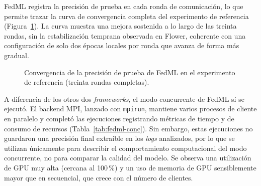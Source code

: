 FedML registra la precisión de prueba en cada ronda de comunicación, lo que permite trazar la
curva de convergencia completa del experimento de referencia (Figura~\ref{fig:fedml-conv}). La
curva muestra una mejora sostenida a lo largo de las treinta rondas, sin la estabilización
temprana observada en Flower, coherente con una configuración de solo dos épocas locales por
ronda que avanza de forma más gradual.

\begin{figure}[htbp]
  \centering
  \caption{Convergencia de la precisión de prueba de FedML en el experimento de referencia
  (treinta rondas completas).}
  \label{fig:fedml-conv}
\end{figure}

A diferencia de los otros dos \textit{frameworks}, el modo concurrente de FedML sí se ejecutó.
El backend MPI, lanzado con \texttt{mpirun}, mantiene varios procesos de cliente en paralelo y
completó las ejecuciones registrando métricas de tiempo y de consumo de recursos
(Tabla~\ref{tab:fedml-conc}). Sin embargo, estas ejecuciones no guardaron una precisión final
extraíble en los \textit{logs} analizados, por lo que se utilizan únicamente para describir el
comportamiento computacional del modo concurrente, no para comparar la calidad del modelo. Se
observa una utilización de GPU muy alta (cercana al 100\,\%) y un uso de memoria de GPU
sensiblemente mayor que en secuencial, que crece con el número de clientes.

